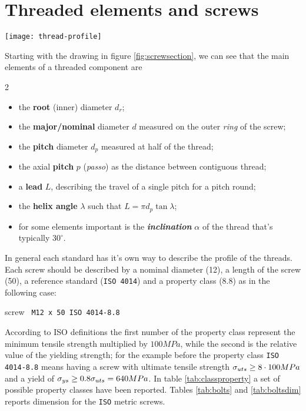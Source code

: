 \section{Threaded elements and screws}
	\begin{SCfigure}[2][b]
		\texttt{[image: thread-profile]} 
		\caption{cross section of a threaded element such a screw.} \label{fig:screwsection}
	\end{SCfigure}
	
	Starting with the drawing in figure \ref{fig:screwsection}, we can see that the main elements of a threaded component are
	\begin{multicols}{2}
	\begin{itemize}
		\item the \textbf{root} (inner) diameter $d_r$;
		\item the \textbf{major/nominal} diameter $d$ measured on the outer \textit{ring} of the screw;
		\item the \textbf{pitch} diameter $d_p$ measured at half of the thread;
		\item the axial \textbf{pitch} $p$ (\textit{passo}) as the distance between contiguous thread;
		\item a \textbf{lead} $L$, describing the travel of a single pitch for a pitch round;
		\item the \textbf{helix angle} $\lambda$ such that $L=\pi d_p \tan \lambda$;
		\item for some elements important is the \textbf{\textit{inclination}} $\alpha$ of the thread that's typically $30^\circ$.
	\end{itemize}
	\end{multicols}

	In general each standard has it's own way to describe the profile of the threads. Each screw should be described by a nominal diameter (12), a length of the screw (50), a reference standard (\texttt{ISO 4014}) and a property class (8.8) as in the following case:
	\begin{center}
		screw \texttt{ M12 x 50 ISO 4014-8.8 }
	\end{center}
	
	According to ISO definitions the first number of the property class represent the minimum tensile strength multiplied by $100 MPa$, while the second is the relative value of the yielding strength; for the example before the property class \texttt{ISO 4014-8.8} means having a screw with ultimate tensile strength $\sigma_{uts} \geq 8\cdot 100 MPa$ and a yield of $\sigma_{ys} \geq 0.8 \sigma_{uts} = 640MPa$. In table \ref{tab:classproperty} a set of possible property classes have been reported. Tables \ref{tab:bolts} and \ref{tab:boltsdim} reports dimension for the \texttt{ISO} metric screws.
	

